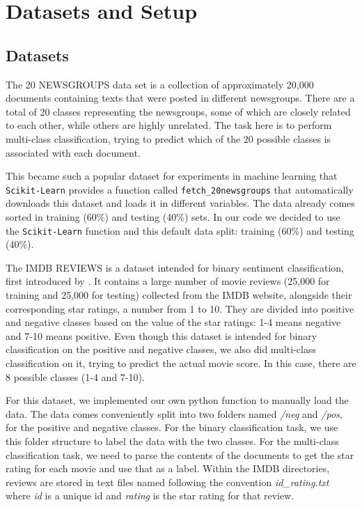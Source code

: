 \documentclass[conference]{IEEEtran}
\begin{document}
\section{Datasets and Setup}
\label{section:datasets}

\subsection{Datasets}

The 20 NEWSGROUPS data set \cite{20NewsgroupsWebsite} is a collection of approximately 20,000 documents containing texts that were posted in different newsgroups. There are a total of 20 classes representing the newsgroups, some of which are closely related to each other, while others are highly unrelated. The task here is to perform multi-class classification, trying to predict which of the 20 possible classes is associated with each document.

This became such a popular dataset for experiments in machine learning that \texttt{Scikit-Learn} provides a function called \texttt{fetch\_20newsgroups} that automatically downloads this dataset and loads it in different variables. The data already comes sorted in training (60\%) and testing (40\%) sets. In our code we decided to use the \texttt{Scikit-Learn} function and this default data split: training (60\%) and testing (40\%).

The IMDB REVIEWS \cite{largeMovieReviewWebsite} is a dataset intended for binary sentiment classification, first introduced by \cite{maas-EtAl:2011:ACL-HLT2011}. It contains a large number of movie reviews (25,000 for training and 25,000 for testing) collected from the IMDB website, alongside their corresponding star ratings, a number from 1 to 10. They are divided into positive and negative classes based on the value of the star ratings: 1-4 means negative and 7-10 means positive. Even though this dataset is intended for binary classification on the positive and negative classes, we also did multi-class classification on it, trying to predict the actual movie score. In this case, there are 8 possible classes (1-4 and 7-10).

For this dataset, we implemented our own python function to manually load the data. The data comes conveniently split into two folders named \textit{/neg} and \textit{/pos}, for the positive and negative classes. For the binary classification task, we use this folder structure to label the data with the two classes. For the multi-class classification task, we need to parse the contents of the documents to get the star rating for each movie and use that as a label. Within the IMDB directories, reviews are stored in text files named following the convention \textit{id\_rating.txt} where \textit{id} is a unique id and \textit{rating} is the star rating for that review.
\end{document}
